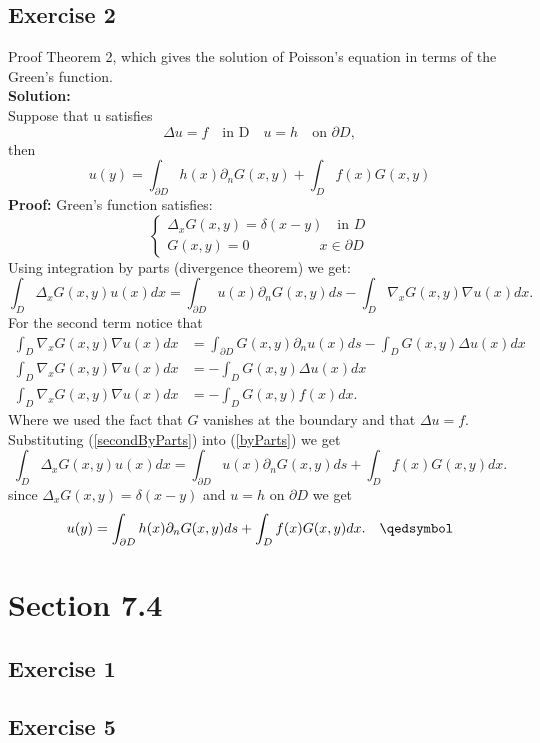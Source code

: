 \documentclass[12pt]{article}%
\begin{document}
\subsection*{Exercise 2}
Proof Theorem 2, which gives the solution of Poisson's equation in terms of the
Green's function.\\
\textbf{Solution:}\\
Suppose that u satisfies
\[
    \Delta u =f \quad \text{in D} \quad u=h \quad \text{on }\partial D,
\]
then
\[
    u(y)=\int_{\partial D}h(x)\partial_nG(x,y) + \int_D f(x)G(x,y)
\]
\textbf{Proof:}
Green's function satisfies:
\[
\begin{cases}
    \Delta_xG(x,y)=\delta(x-y) \quad \text{in } D\\
    G(x,y)=0 \qquad\qquad\quad x\in \partial D
\end{cases}
\]
Using integration by parts (divergence theorem) we get:
\begin{equation}\label{byParts}
    \int_D \Delta_x G(x,y)u(x)dx=\int_{\partial D} u(x)\partial_nG(x,y)ds - \int_D \nabla_xG(x,y)\nabla u(x)dx.
\end{equation}
For the second term notice that
\begin{align} \label{secondByParts}
    \int_D \nabla_xG(x,y)\nabla u(x)dx&=\int_{\partial D}G(x,y)\partial_nu(x)ds - \int_D G(x,y)\Delta u(x)dx \nonumber\\
    \int_D \nabla_xG(x,y)\nabla u(x)dx&=- \int_D G(x,y)\Delta u(x)dx \nonumber\\
    \int_D \nabla_xG(x,y)\nabla u(x)dx&=- \int_D G(x,y)f(x)dx.
\end{align}
Where we used the fact that $G$ vanishes at the boundary and that $\Delta u =f$.
Substituting (\ref{secondByParts}) into (\ref{byParts}) we get
\[
    \int_D \Delta_x G(x,y)u(x)dx=\int_{\partial D} u(x)\partial_nG(x,y)ds + \int_D f(x)G(x,y)dx.
\]
since $\Delta_xG(x,y)=\delta(x-y)$ and $u=h$ on $\partial D$ we get
\[
    u(y)=\int_{\partial D} h(x)\partial_nG(x,y)ds + \int_D f(x)G(x,y)dx. \quad \qedsymbol
\]
\section*{Section 7.4}
\subsection*{Exercise 1}
\subsection*{Exercise 5}
\end{document}
